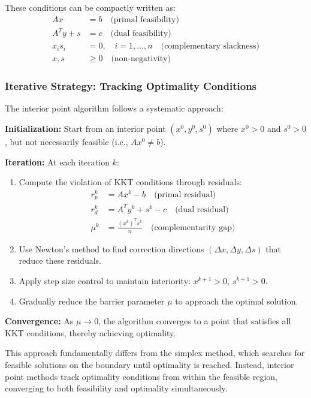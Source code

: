 These conditions can be compactly written as:
\begin{align}
Ax &= b \quad \text{(primal feasibility)} \\
A^T y + s &= c \quad \text{(dual feasibility)} \\
x_i s_i &= 0, \quad i = 1, \ldots, n \quad \text{(complementary slackness)} \\
x, s &\geq 0 \quad \text{(non-negativity)}
\end{align}


\subsubsection{Iterative Strategy: Tracking Optimality Conditions}

The interior point algorithm follows a systematic approach:

\textbf{Initialization:} Start from an interior point $(x^0, y^0, s^0)$ where $x^0 > 0$ and $s^0 > 0$, but not necessarily feasible (i.e., $Ax^0 \neq b$).

\textbf{Iteration:} At each iteration $k$:
\begin{enumerate}
\item Compute the violation of KKT conditions through residuals:
\begin{align}
r_p^k &= Ax^k - b \quad \text{(primal residual)} \\
r_d^k &= A^T y^k + s^k - c \quad \text{(dual residual)} \\
\mu^k &= \frac{(x^k)^T s^k}{n} \quad \text{(complementarity gap)}
\end{align}

\item Use Newton's method to find correction directions $(\Delta x, \Delta y, \Delta s)$ that reduce these residuals.

\item Apply step size control to maintain interiority: $x^{k+1} > 0$, $s^{k+1} > 0$.

\item Gradually reduce the barrier parameter $\mu$ to approach the optimal solution.
\end{enumerate}

\textbf{Convergence:} As $\mu \to 0$, the algorithm converges to a point that satisfies all KKT conditions, thereby achieving optimality.

This approach fundamentally differs from the simplex method, which searches for feasible solutions on the boundary until optimality is reached. Instead, interior point methods track optimality conditions from within the feasible region, converging to both feasibility and optimality simultaneously.

